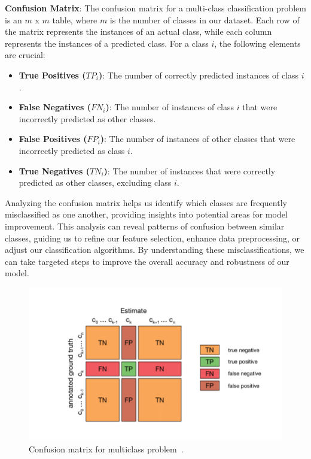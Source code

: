 \textbf{Confusion Matrix}: The confusion matrix for a multi-class classification problem is an $m$ x $m$ table, where $m$ is the number of classes in our dataset. Each row of the matrix represents the instances of an actual class, while each column represents the instances of a predicted class. For a class $i$, the following elements are crucial:
\begin{itemize}
    \item \textbf{True Positives ($TP_i$)}: The number of correctly predicted instances of class $i$.
    \item \textbf{False Negatives ($FN_i$)}: The number of instances of class $i$ that were incorrectly predicted as other classes.
    \item \textbf{False Positives ($FP_i$)}: The number of instances of other classes that were incorrectly predicted as class $i$.
    \item \textbf{True Negatives ($TN_i$)}: The number of instances that were correctly predicted as other classes, excluding class $i$.
\end{itemize}

Analyzing the confusion matrix helps us identify which classes are frequently misclassified as one another, providing insights into potential areas for model improvement. This analysis can reveal patterns of confusion between similar classes, guiding us to refine our feature selection, enhance data preprocessing, or adjust our classification algorithms. By understanding these misclassifications, we can take targeted steps to improve the overall accuracy and robustness of our model.

\begin{figure}[!htb]
    \centering
    \includegraphics[scale=0.4]{Images/confusion_matrix.png}
    \caption{Confusion matrix for multiclass problem~\cite{ConfusionMatrix}.}
    \label{fig:confusionMatrix}
\end{figure}

